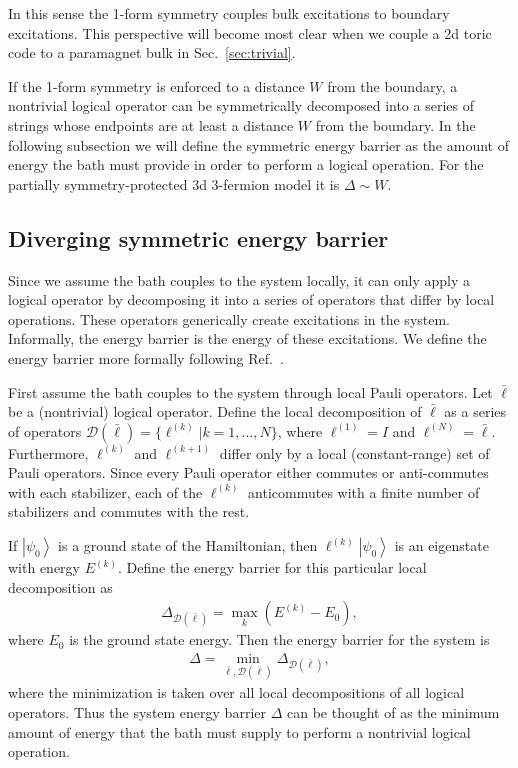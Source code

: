 \documentclass[twocolumn, longbibliography]{revtex4-2}
\renewcommand{\l}{\ell}
\newcommand{\ket}[1]{\left|#1\right\rangle}
\begin{document}
In this sense the 1-form symmetry couples bulk excitations to boundary excitations. This perspective will become most clear when we couple a 2d toric code to a paramagnet bulk in Sec.~\ref{sec:trivial}.

If the 1-form symmetry is enforced to a distance $W$ from the boundary, a nontrivial logical operator can be symmetrically decomposed into a series of strings whose endpoints are at least a distance $W$ from the boundary. 
In the following subsection we will define the symmetric energy barrier as the amount of energy the bath must provide in order to perform a logical operation. For the partially symmetry-protected 3d 3-fermion model it is $\Delta\sim W$.

\subsection{Diverging symmetric energy barrier} \label{sub:ener}
	
Since we assume the bath couples to the system locally, it can only apply a logical operator by decomposing it into a series of operators that differ by local operations. These operators generically create excitations in the system. Informally, the energy barrier is the energy of these excitations. We define the energy barrier more formally following Ref.~\cite{RobertsBartlett}.
	
First assume the bath couples to the system through local Pauli operators. Let $\bar{\l}$ be a (nontrivial) logical operator. Define the local decomposition of $\bar{\l}$ as a series of operators $\mathcal{D}(\bar{\l}) = \{\l^{(k)}| k = 1,\dots,N\}$, where $\l^{(1)}=I$ and $\l^{(N)}=\bar{\l}$. Furthermore, $\l^{(k)}$ and $\l^{(k+1)}$ differ only by a local (constant-range) set of Pauli operators. Since every Pauli operator either commutes or anti-commutes with each stabilizer, each of the $\l^{(k)}$ anticommutes with a finite number of stabilizers and commutes with the rest.
	
If $\ket{\psi_0}$ is a ground state of the Hamiltonian, then $\l^{(k)}\ket{\psi_0}$ is an eigenstate with energy $E^{(k)}$. Define the energy barrier for this particular local decomposition as
\begin{align}
\Delta_{\mathcal{D}(\bar{\l})}=\max_k(E^{(k)}-E_0),
\end{align}
where $E_0$ is the ground state energy. Then the energy barrier for the system is
\begin{align}
\Delta = \min_{\bar{\l},\mathcal{D}(\bar{\l})}\Delta_{\mathcal{D}(\bar{\l})},
\end{align}
where the minimization is taken over all local decompositions of all logical operators. Thus the system energy barrier $\Delta$ can be thought of as the minimum amount of energy that the bath must supply to perform a nontrivial logical operation.
\end{document}
